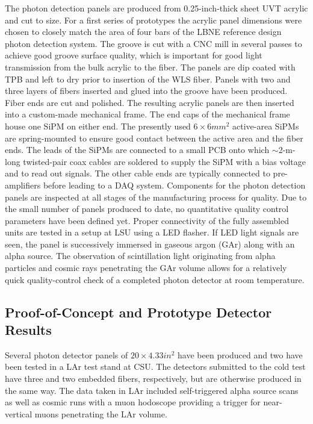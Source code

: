 The photon detection panels are produced from 0.25-inch-thick
sheet UVT acrylic and cut to size. For a first series of prototypes
the acrylic panel dimensions were chosen to closely match the area of
four bars of the LBNE reference design photon detection system.  The groove is
cut with a CNC mill in several passes to achieve good groove surface
quality, which is important for good light transmission from the bulk
acrylic to the fiber. The panels are dip coated with TPB and left to
dry prior to insertion of the WLS fiber. Panels with two and three
layers of fibers inserted and glued into the groove have been
produced. Fiber ends are cut and polished.  The resulting acrylic
panels are then inserted into a custom-made mechanical frame.%
The end caps of the mechanical frame
house one SiPM on either end. The presently used $6\times6 mm^2$ active-area
SiPMs are spring-mounted to ensure good contact between the active area
and the fiber ends.  The leads of the SiPMs are connected to a small
PCB  onto which $\sim$2-m-long twisted-pair coax cables are soldered to
supply the SiPM with a bias voltage and to read out signals. The other
cable ends are typically connected to pre-amplifiers before leading to
a DAQ system.  Components for the photon detection panels are
inspected at all stages of the manufacturing process for quality. Due
to the small number of panels produced to date, no quantitative quality
control parameters have been defined yet.  Proper connectivity of the
fully assembled units are tested in a setup at LSU using a LED
flasher. If LED light signals are seen, the panel is successively
immersed in gaseous argon (GAr) along with an alpha source. The
observation of %
scintillation light originating from alpha
particles and cosmic rays penetrating the GAr volume allows for a
relatively quick quality-control check of a completed photon detector
at room temperature.

\subsection{Proof-of-Concept and Prototype Detector Results}

Several photon detector panels of $20 \times 4.33 in^2$ have been
produced and two have been tested in a LAr test stand at CSU. The
detectors submitted to the cold test have three and two embedded fibers,
respectively, but are otherwise produced in the same way. The data
taken in LAr included self-triggered alpha source scans as well as
cosmic runs with a muon hodoscope providing a trigger for near-vertical muons penetrating the LAr volume.
